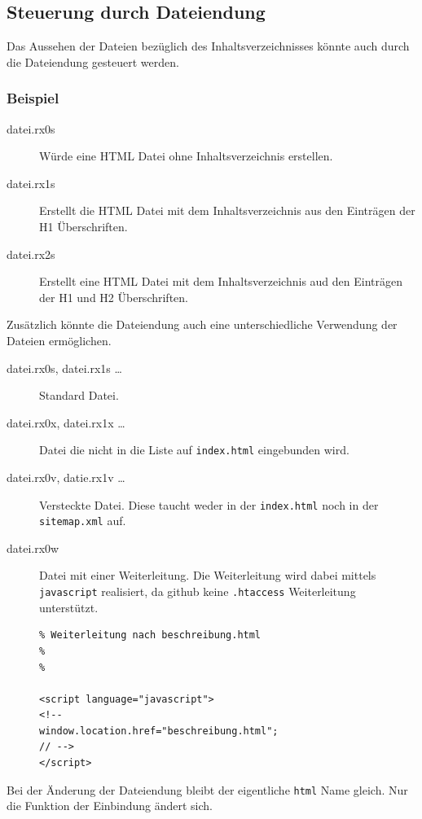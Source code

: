 \documentclass[%
fontsize=12pt,%
parskip=half,%
version=last%
]{scrreprt}
\begin{document}
\subsection{Steuerung durch
Dateiendung}\label{steuerung-durch-dateiendung}

Das Aussehen der Dateien bezüglich des Inhaltsverzeichnisses könnte auch
durch die Dateiendung gesteuert werden.

\subsubsection{Beispiel}\label{beispiel}

\begin{description}
\item[datei.rx0s]
Würde eine HTML Datei ohne Inhaltsverzeichnis erstellen.
\item[datei.rx1s]
Erstellt die HTML Datei mit dem Inhaltsverzeichnis aus den Einträgen der
H1 Überschriften.
\item[datei.rx2s]
Erstellt eine HTML Datei mit dem Inhaltsverzeichnis aud den Einträgen
der H1 und H2 Überschriften.
\end{description}

Zusätzlich könnte die Dateiendung auch eine unterschiedliche Verwendung
der Dateien ermöglichen.

\begin{description}
\item[datei.rx0s, datei.rx1s \ldots{}]
Standard Datei.
\item[datei.rx0x, datei.rx1x \ldots{}]
Datei die nicht in die Liste auf \texttt{index.html} eingebunden wird.
\item[datei.rx0v, datie.rx1v \ldots{}]
Versteckte Datei. Diese taucht weder in der \texttt{index.html} noch in
der \texttt{sitemap.xml} auf.
\item[datei.rx0w]
Datei mit einer Weiterleitung. Die Weiterleitung wird dabei mittels
\texttt{javascript} realisiert, da github keine \texttt{.htaccess}
Weiterleitung unterstützt.

\begin{verbatim}
% Weiterleitung nach beschreibung.html
%
%

<script language="javascript">
<!--
window.location.href="beschreibung.html";
// -->
</script> 
\end{verbatim}
\end{description}

Bei der Änderung der Dateiendung bleibt der eigentliche \texttt{html}
Name gleich. Nur die Funktion der Einbindung ändert sich.
\end{document}
